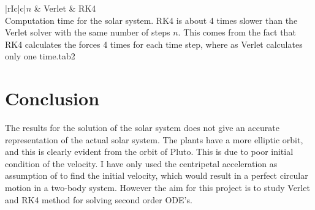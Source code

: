 \documentclass[11pt,english,a4paper]{article}
\begin{document}
\begin{flushleft}
\newpage

\newpage


\begin{tabell}{|rIc|c|}{\small}{$n$ & Verlet & RK4 \\}{}{Computation time for the solar system. RK4 is about 4 times slower than the Verlet solver with the same number of steps $n$. This comes from the fact that RK4 calculates the forces 4 times for each time step, where as Verlet calculates only one time.}{tab2}
\end{tabell}

\newpage

\section{Conclusion}

The results for the solution of the solar system does not give an accurate representation of the actual solar system. The plants have a more elliptic orbit, and this is clearly evident from the orbit of Pluto. This is due to poor initial condition of the velocity. I have only used the centripetal acceleration as assumption of to find the initial velocity, which would result in a perfect circular motion in a two-body system. However the aim for this project is to study Verlet and RK4 method for solving second order ODE's. \linebreak


\end{flushleft}
\end{document}
